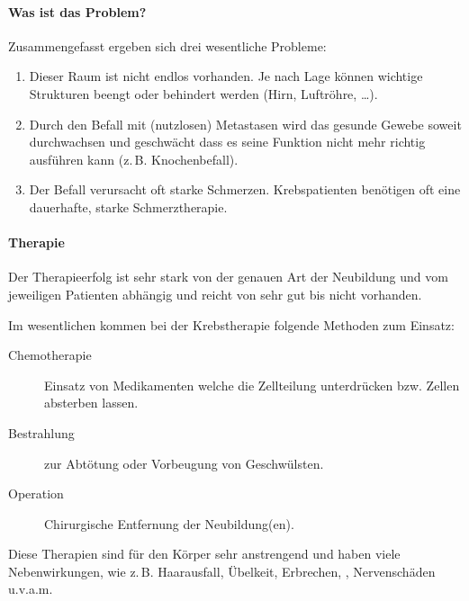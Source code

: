 \paragraph{Was ist das Problem?}

Zusammengefasst ergeben sich drei wesentliche Probleme:

\begin{enumerate}
    \item {} Dieser Raum ist
    nicht endlos vorhanden. Je nach Lage können wichtige
    Strukturen beengt oder behindert werden (Hirn,
    Luftröhre, \ldots).
    \item {}
    Durch den Befall mit (nutzlosen) Metastasen wird das
    gesunde Gewebe soweit durchwachsen und geschwächt dass
    es seine Funktion nicht mehr richtig ausführen kann
    (z.\,B. Knochenbefall).
    \item {} Der Befall verursacht oft starke
    Schmerzen. Krebspatienten benötigen oft eine
    dauerhafte, starke Schmerztherapie.
\end{enumerate}

\paragraph{Therapie}

Der Therapieerfolg ist sehr stark von der genauen Art der
Neubildung und vom jeweiligen Patienten abhängig und reicht
von sehr gut bis nicht vorhanden. 

Im wesentlichen kommen bei der Krebstherapie folgende
Methoden zum Einsatz:

\begin{description}
    \item[Chemotherapie] Einsatz von Medikamenten welche
    die Zellteilung unterdrücken bzw. Zellen absterben
    lassen.
    \item[Bestrahlung] zur Abtötung oder Vorbeugung von
    Geschwülsten.
    \item[Operation] Chirurgische Entfernung der
    Neubildung(en).
\end{description}

Diese Therapien sind für den Körper sehr anstrengend und
haben viele Nebenwirkungen, wie z.\,B. Haarausfall, Übelkeit,
Erbrechen, , Nervenschäden
u.v.a.m.



